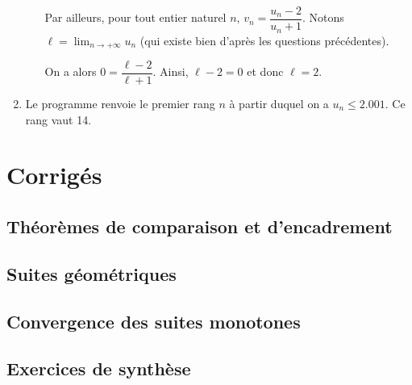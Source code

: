 \documentclass[11pt,fleqn, openany]{book} %
\begin{document}
\begin{solution}
\begin{enumerate}
\begin{enumerate}
 Par ailleurs, pour tout entier naturel $n$, $v_n=\dfrac{u_n-2}{u_n+1}$. Notons $\ell=\displaystyle\lim_{n\to+\infty}u_n$ (qui existe bien d'après les questions précédentes). 

On a alors $0=\dfrac{\ell-2}{\ell+1}$. Ainsi, $\ell-2=0$ et donc $\ell=2$. 
\end{enumerate}
\item Le programme renvoie le premier rang $n$ à partir duquel on a $u_n\leqslant 2.001$. Ce rang vaut 14.
\end{enumerate}
\end{solution}




\chapter{Corrigés}


\section*{Théorèmes de comparaison et d'encadrement}

\printsolutions[collection={lim11}, headings={false} ]

\section*{Suites géométriques}

\printsolutions[collection={lim12}, headings={false} ]

\section*{Convergence des suites monotones}

\printsolutions[collection={lim13}, headings={false} ]

\section*{Exercices de synthèse}

\printsolutions[collection={lim14}, headings={false} ]
 
\end{document}
